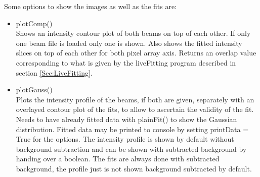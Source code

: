 \documentclass[twoside,openright]{scrreprt}
\begin{document}
Some options to show the images as well as the fits are:
\begin{itemize}
\item plotComp()\\
Shows an intensity contour plot of both beams on top of each other. If only one beam file is loaded only one is shown. Also shows the fitted intensity slices on top of each other for both pixel array axis. Returns an overlap value corresponding to what is given by the liveFitting program described in section \ref{Sec:LiveFitting}.
\item plotGauss()\\
Plots the intensity profile of the beams, if both are given, separately with an overlayed contour plot of the fits, to allow to ascertain the validity of the fit. Needs to have already fitted data with plainFit() to show the Gaussian distribution. Fitted data may be printed to console by setting printData = True for the options. The intensity profile is shown by default without background subtraction and can be shown with subtracted background by handing over a boolean. The fits are always done with subtracted background, the profile just is not shown background subtracted by default.
\end{itemize}
\end{document}
